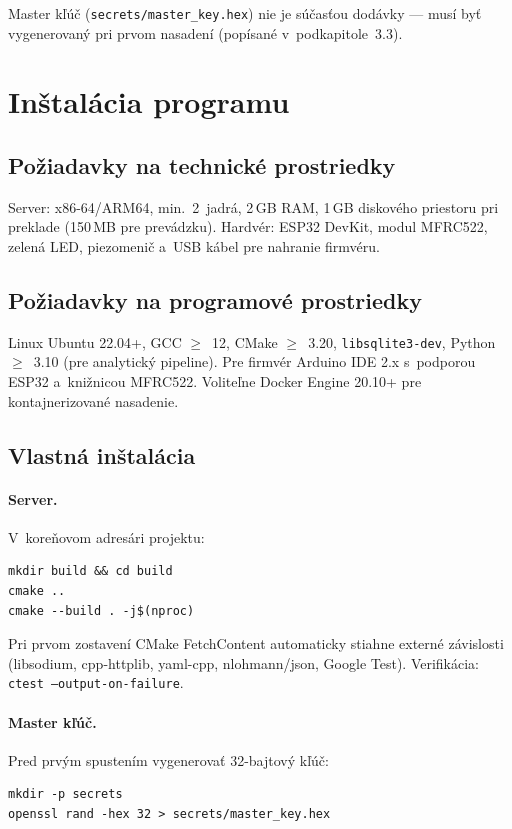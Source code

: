 \documentclass[a4paper]{feidippp}
\begin{document}
\noindent Master kľúč (\texttt{secrets/master\_key.hex}) nie je súčasťou dodávky --- musí byť vygenerovaný pri prvom nasadení (popísané v~podkapitole~3.3).

\section{Inštalácia programu}

\subsection{Požiadavky na technické prostriedky}

Server: x86-64/ARM64, min.\ 2~jadrá, 2\,GB RAM, 1\,GB diskového priestoru pri preklade (150\,MB pre prevádzku). Hardvér: ESP32 DevKit, modul MFRC522, zelená LED, piezomenič a~USB kábel pre nahranie firmvéru.

\subsection{Požiadavky na programové prostriedky}

Linux Ubuntu 22.04+, GCC $\geq$~12, CMake $\geq$~3.20, \texttt{libsqlite3-dev}, Python $\geq$~3.10 (pre analytický pipeline). Pre firmvér Arduino IDE 2.x s~podporou ESP32 a~knižnicou MFRC522. Voliteľne Docker Engine 20.10+ pre kontajnerizované nasadenie.

\subsection{Vlastná inštalácia}

\paragraph{Server.} V~koreňovom adresári projektu:
\begin{verbatim}
mkdir build && cd build
cmake ..
cmake --build . -j$(nproc)
\end{verbatim}

\noindent Pri prvom zostavení CMake FetchContent automaticky stiahne externé závislosti (libsodium, cpp-httplib, yaml-cpp, nlohmann/json, Google Test). Verifikácia: \texttt{ctest --output-on-failure}.

\paragraph{Master kľúč.} Pred prvým spustením vygenerovať 32-bajtový kľúč:
\begin{verbatim}
mkdir -p secrets
openssl rand -hex 32 > secrets/master_key.hex
\end{verbatim}
\end{document}
